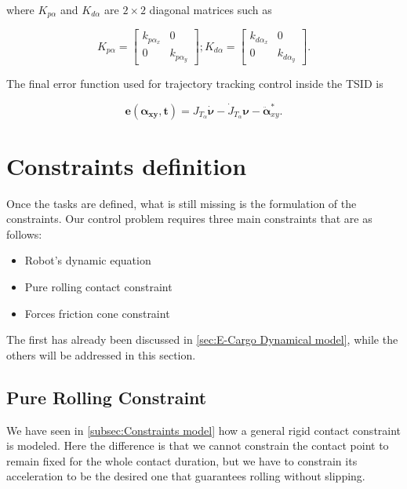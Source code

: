 where $K_{p\alpha}$ and $K_{d\alpha}$ are $2 \times 2$ diagonal matrices such as

\begin{equation}
    K_{p\alpha} = \begin{bmatrix}
        k_{p\alpha_x} & 0 \\
        0 & k_{p\alpha_y}
    \end{bmatrix}; K_{d\alpha} = \begin{bmatrix}
        k_{d\alpha_x} & 0 \\
        0 & k_{d\alpha_y}
    \end{bmatrix}.
\end{equation}

The final error function used for trajectory tracking control inside the TSID is 

\begin{equation}
   \mathbf{e(\bm{\alpha}_{xy},t)} =J_{T_{\alpha}}{\dot{\bm{\nu}}} - \dot{J}_{T_{\alpha}}\bm{\nu} - \ddot{\bm{\alpha}}_{xy}^{*} 
    \label{eq: Tracking error task}.
\end{equation}

\section{Constraints definition}
\label{sec:Constraints definition}

Once the tasks are defined, what is still missing is the formulation of the constraints. 
Our control problem requires three main constraints that are as follows:

\begin{itemize}
    \item Robot's dynamic equation
    \item Pure rolling contact constraint
    \item Forces friction cone constraint
\end{itemize}

The first has already been discussed in \cref{sec:E-Cargo Dynamical model}, while the others will be addressed in this section. 

\subsection{Pure Rolling Constraint}
\label{subsec:Pure Rolling Constraint}

We have seen in \cref{subsec:Constraints model} how a general rigid contact constraint is modeled.
Here the difference is that we cannot constrain the contact point to remain fixed for the whole contact duration, but we have to constrain its acceleration to be the desired one that guarantees rolling without slipping.

